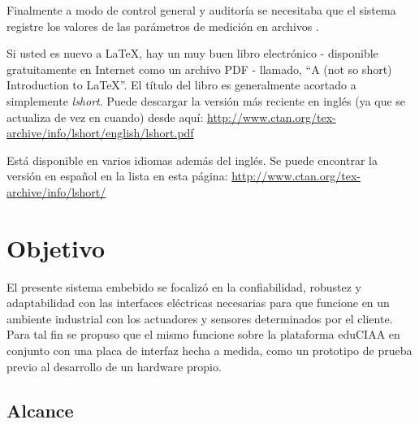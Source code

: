 Finalmente a modo de control general y auditoría se necesitaba que el sistema registre los valores de las parámetros de medición en archivos . 

Si usted es nuevo a \LaTeX{}, hay un muy buen libro electrónico - disponible gratuitamente en Internet como un archivo PDF - llamado, \enquote{A (not so short) Introduction to \LaTeX{}}. El título del libro es generalmente acortado a simplemente \emph{lshort}. Puede descargar la versión más reciente en inglés (ya que se actualiza de vez en cuando) desde aquí:
\url{http://www.ctan.org/tex-archive/info/lshort/english/lshort.pdf}

Está disponible en varios idiomas además del inglés. Se puede encontrar la versión en español en la lista en esta página: \url{http://www.ctan.org/tex-archive/info/lshort/}


\section{Objetivo}

El presente sistema embebido se focalizó en la confiabilidad, robustez y adaptabilidad con las interfaces eléctricas necesarias para que funcione en un ambiente industrial con los actuadores y sensores determinados por el cliente. Para tal fin se propuso que el mismo funcione sobre la plataforma eduCIAA en conjunto con una placa de interfaz hecha a medida, como un prototipo de prueba previo al desarrollo de un hardware propio.

\subsection{Alcance}

